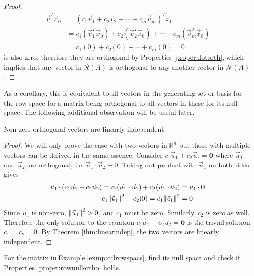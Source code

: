 \begin{proof}
\begin{align*}
\vec{v}^T\vec{x}_0 &= (c_1\vec{v}_1 + c_2\vec{v}_2 + \cdots + c_m\vec{v}_m)^T\vec{x}_0 \\
&= c_1(\vec{v}_1^T\vec{x}_0) + c_2(\vec{v}_2^T\vec{x}_0) + \cdots + c_m(\vec{v}_m^T\vec{x}_0) \\
&= c_1(0) + c_2(0) + \cdots + c_m(0) = 0
\end{align*}
is also zero, therefore they are orthogonal by Properties \ref{proper:dotorth}, which implies that any vector in $\mathcal{R}(A)$ is orthogonal to any another vector in $\mathcal{N}(A)$.
\end{proof}
As a corollary, this is equivalent to all vectors in the generating set or basis for the row space for a matrix being orthogonal to all vectors in those for its null space. The following additional observation will be useful later.
\begin{proper}
\label{proper:ortholinind}
Non-zero orthogonal vectors are linearly independent.
\end{proper}
\begin{proof}
We will only prove the case with two vectors in $\mathbb{R}^n$ but those with multiple vectors can be derived in the same essence. Consider $c_1\vec{u}_1 + c_2\vec{u}_2 = \textbf{0}$ where $\vec{u}_1$ and $\vec{u}_2$ are orthogonal, i.e. $\vec{u}_1 \cdot \vec{u}_2 = 0$. Taking dot product with $\vec{u}_1$ on both sides gives
\begin{align*}
\vec{u}_1 \cdot (c_1\vec{u}_1 + c_2\vec{u}_2) = c_1(\vec{u}_1 \cdot \vec{u}_1) + c_2(\vec{u}_1 \cdot \vec{u}_2) &= \vec{u}_1 \cdot \textbf{0} \\
c_1 \norm{\vec{u}_1}^2 + c_2 (0) = c_1 \norm{\vec{u}_1}^2 &= 0
\end{align*}
Since $\vec{u}_1$ is non-zero, $\norm{\vec{u}_1}^2 > 0$, and $c_1$ must be zero. Similarly, $c_2$ is zero as well. Therefore the only solution to the equation $c_1\vec{u}_1 + c_2\vec{u}_2 = \textbf{0}$ is the trivial solution $c_1 = c_2 = 0$. By Theorem \ref{thm:linearindep}, the two vectors are linearly independent.
\end{proof}
\begin{exmp}
\label{exmp:colrowspace2}
For the matrix in Example \ref{exmp:colrowspace}, find its null space and check if Properties \ref{proper:rownullortho} holds.
\end{exmp}
